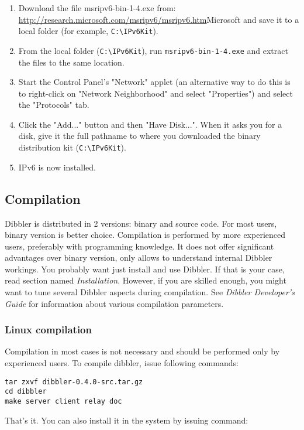 \begin{enumerate}
  \item Download the file msripv6-bin-1-4.exe from:
    \url{http://research.microsoft.com/msripv6/msripv6.htm}{Microsoft}
    and save it to a local folder (for example, \verb+C:\IPv6Kit+).
  \item From the local folder (\verb+C:\IPv6Kit+), run \verb+msripv6-bin-1-4.exe+ and extract the
    files to the same location.
  \item Start the Control Panel's "Network" applet (an alternative way to do this is
    to right-click on "Network Neighborhood" and select "Properties") and select
    the "Protocols" tab.
  \item Click the "Add..." button and then "Have Disk...". When it asks you for
    a disk, give it the full pathname to where you downloaded the binary
    distribution kit (\verb+C:\IPv6Kit+).
  \item IPv6 is now installed.
\end{enumerate}

\subsection{Compilation}
Dibbler is distributed in 2 versions: binary and source code. For
most users, binary version is better choice.  Compilation is
performed by more experienced users, preferably with programming
knowledge. It does not offer significant advantages over binary version,
only allows to understand internal Dibbler workings. You probably want
just install and use Dibbler. If that is your case, read section
named \emph{Installation}. However, if you are skilled enough, you might
want to tune several Dibbler aspects during compilation. See \emph{
Dibbler Developer's Guide} for information about various compilation parameters.

\subsubsection{Linux compilation}

Compilation in most cases is not necessary and should be performed
only by experienced users. To compile dibbler, issue following commands:
\begin{verbatim}
tar zxvf dibbler-0.4.0-src.tar.gz
cd dibbler
make server client relay doc
\end{verbatim}
That's it. You can also install it in the system by issuing command:

